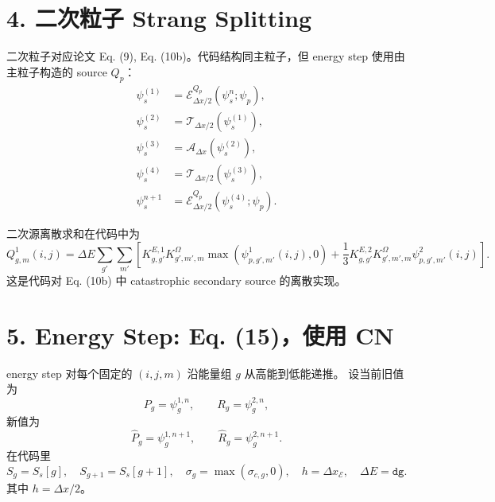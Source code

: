 \documentclass[11pt,a4paper]{ctexart}
\begin{document}
\section*{4. 二次粒子 Strang Splitting}

二次粒子对应论文 Eq. (9), Eq. (10b)。代码结构同主粒子，但 energy step 使用由主粒子构造的
source \(Q_p\)：
\begin{equation}
\begin{aligned}
  \psi_{s}^{(1)}
    &= \mathcal E_{\Delta x/2}^{Q_p}(\psi_s^n;\psi_p),\\
  \psi_{s}^{(2)}
    &= \mathcal T_{\Delta x/2}(\psi_s^{(1)}),\\
  \psi_{s}^{(3)}
    &= \mathcal A_{\Delta x}(\psi_s^{(2)}),\\
  \psi_{s}^{(4)}
    &= \mathcal T_{\Delta x/2}(\psi_s^{(3)}),\\
  \psi_{s}^{n+1}
    &= \mathcal E_{\Delta x/2}^{Q_p}(\psi_s^{(4)};\psi_p).
\end{aligned}
\end{equation}

二次源离散求和在代码中为
\begin{equation}
  Q_{g,m}^{1}(i,j)
  =
  \Delta E
  \sum_{g'}\sum_{m'}
  \left[
    K^{E,1}_{g,g'} K^{\Omega}_{g',m',m}
    \max(\psi^{1}_{p,g',m'}(i,j),0)
    +
    \frac13
    K^{E,2}_{g,g'} K^{\Omega}_{g',m',m}
    \psi^{2}_{p,g',m'}(i,j)
  \right].
\end{equation}
这是代码对 Eq. (10b) 中 catastrophic secondary source 的离散实现。

\section*{5. Energy Step: Eq. (15)，使用 CN}

energy step 对每个固定的 \((i,j,m)\) 沿能量组 \(g\) 从高能到低能递推。
设当前旧值为
\begin{equation}
  P_g=\psi^{1,n}_g,\qquad R_g=\psi^{2,n}_g,
\end{equation}
新值为
\begin{equation}
  \widehat P_g=\psi^{1,n+1}_g,\qquad
  \widehat R_g=\psi^{2,n+1}_g.
\end{equation}
在代码里
\begin{equation}
  S_g=S_s[g],\quad S_{g+1}=S_s[g+1],\quad
  \sigma_g=\max(\sigma_{c,g},0),\quad
  h=\Delta x_{\mathcal E},\quad \Delta E=\texttt{dg}.
\end{equation}
其中 \(h=\Delta x/2\)。
\end{document}
